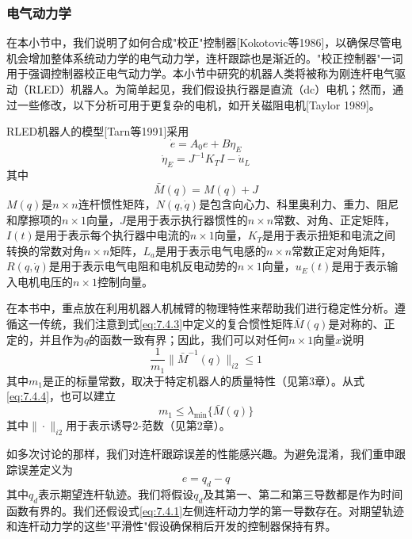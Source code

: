 \documentclass[UTF8]{ctexart}
\begin{document}
\subsubsection*{电气动力学}

在本小节中，我们说明了如何合成"校正"控制器[Kokotovic等1986]，以确保尽管电机会增加整体系统动力学的电气动力学，连杆跟踪也是渐近的。"校正控制器"一词用于强调控制器校正电气动力学。本小节中研究的机器人类将被称为刚连杆电气驱动（RLED）机器人。为简单起见，我们假设执行器是直流（dc）电机；然而，通过一些修改，以下分析可用于更复杂的电机，如开关磁阻电机[Taylor 1989]。

RLED机器人的模型[Tarn等1991]采用
\begin{equation}\label{eq:7.4.1}
\dot{e} = A_0 e + B\eta_E
\end{equation}
\begin{equation}\label{eq:7.4.2}
\dot{\eta}_E = J^{-1}K_T I - \dot{u}_L
\end{equation}
其中
\begin{equation}\label{eq:7.4.3}
\bar{M}(q) = M(q) + J
\end{equation}
$M(q)$是$n \times n$连杆惯性矩阵，$N(q,\dot{q})$是包含向心力、科里奥利力、重力、阻尼和摩擦项的$n \times 1$向量，$J$是用于表示执行器惯性的$n \times n$常数、对角、正定矩阵，$I(t)$是用于表示每个执行器中电流的$n \times 1$向量，$K_T$是用于表示扭矩和电流之间转换的常数对角$n \times n$矩阵，$L_a$是用于表示电气电感的$n \times n$常数正定对角矩阵，$R(q,\dot{q})$是用于表示电气电阻和电机反电动势的$n \times 1$向量，$u_E(t)$是用于表示输入电机电压的$n \times 1$控制向量。

在本书中，重点放在利用机器人机械臂的物理特性来帮助我们进行稳定性分析。遵循这一传统，我们注意到式\eqref{eq:7.4.3}中定义的复合惯性矩阵$\bar{M}(q)$是对称的、正定的，并且作为$q$的函数一致有界；因此，我们可以对任何$n \times 1$向量$x$说明
\begin{equation}\label{eq:7.4.4}
\frac{1}{m_1}\|\bar{M}^{-1}(q)\|_{i2} \leq 1
\end{equation}
其中$m_1$是正的标量常数，取决于特定机器人的质量特性（见第3章）。从式\eqref{eq:7.4.4}，也可以建立
\begin{equation}\label{eq:7.4.5}
m_1 \leq \lambda_{\min}\{\bar{M}(q)\}
\end{equation}
其中$\|\cdot\|_{i2}$用于表示诱导2-范数（见第2章）。

如多次讨论的那样，我们对连杆跟踪误差的性能感兴趣。为避免混淆，我们重申跟踪误差定义为
\begin{equation}\label{eq:7.4.6}
e = q_d - q
\end{equation}
其中$q_d$表示期望连杆轨迹。我们将假设$q_d$及其第一、第二和第三导数都是作为时间函数有界的。我们还假设式\eqref{eq:7.4.1}左侧连杆动力学的第一导数存在。对期望轨迹和连杆动力学的这些"平滑性"假设确保稍后开发的控制器保持有界。
\end{document}
